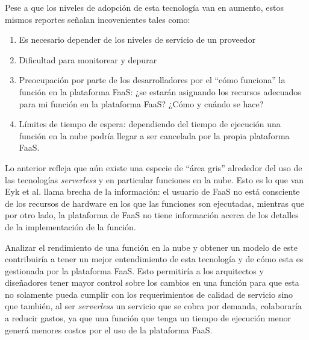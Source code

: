 Pese a que los niveles de adopción de esta tecnología van en aumento, estos mismos reportes señalan incovenientes tales como:
\begin{enumerate}
    \item Es necesario depender de los niveles de servicio de un proveedor
    \item Dificultad para monitorear y depurar
    \item Preocupación por parte de los desarrolladores por el ``cómo funciona'' la función en la plataforma FaaS: ¿se estarán asignando los recursos adecuados para mi función en la plataforma FaaS? ¿Cómo y cuándo se hace?
    \item Límites de tiempo de espera: dependiendo del tiempo de ejecución una función en la nube podría llegar a ser cancelada por la propia plataforma FaaS.
\end{enumerate}

Lo anterior refleja que aún existe una especie de ``área gris'' alrededor del uso de las tecnologías \emph{serverless} y en particular funciones en la nube. Esto es lo que van Eyk et al.\cite{vanEyk:2018:SRC:3185768.3186308} llama brecha de la información: el usuario de FaaS no está consciente de los recursos de hardware en los que las funciones son ejecutadas, mientras que por otro lado, la plataforma de FaaS no tiene información acerca de los detalles de la implementación de la función.

Analizar el rendimiento de una función en la nube y obtener un modelo de este contribuiría a tener un mejor entendimiento de esta tecnología y de cómo esta es gestionada por la plataforma FaaS. Esto permitiría a los arquitectos y diseñadores tener mayor control sobre los cambios en una función para que esta no solamente pueda cumplir con los requerimientos de calidad de servicio sino que también, al ser \emph{serverless} un servicio que se cobra por demanda, colaboraría a reducir gastos, ya que una función que tenga un tiempo de ejecución menor generá menores costos por el uso de la plataforma FaaS.

